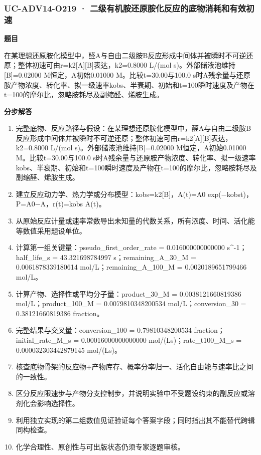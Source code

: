\documentclass[UTF8,11pt,a4paper]{ctexart}
\begin{document}
\subsubsection*{UC-ADV14-O219 · 二级有机胺还原胺化反应的底物消耗和有效初速}
\noindent\textbf{题目}\par
在某理想还原胺化模型中，醛A与自由二级胺B反应形成中间体并被瞬时不可逆还原；整体初速可由r=k2[A][B]表达，k2=0.8000 L/(mol s)。外部储液池维持[B]=0.02000 M恒定，A初始0.01000 M。比较t=30.00与100.0 s时A残余量与还原胺产物浓度、转化率、拟一级速率kobs、半衰期、初始和t=100瞬时速度及产物在t=100的摩尔比，忽略胺耗尽及副缩醛、烯胺生成。\par
\medskip\noindent\textbf{分步解答}
\begin{enumerate}
\item 完整底物、反应路径与假设：在某理想还原胺化模型中，醛A与自由二级胺B反应形成中间体并被瞬时不可逆还原；整体初速可由r=k2[A][B]表达，k2=0.8000 L/(mol s)。外部储液池维持[B]=0.02000 M恒定，A初始0.01000 M。比较t=30.00与100.0 s时A残余量与还原胺产物浓度、转化率、拟一级速率kobs、半衰期、初始和t=100瞬时速度及产物在t=100的摩尔比，忽略胺耗尽及副缩醛、烯胺生成。
\item 建立反应动力学、热力学或分布模型：kobs=k2[B]，A(t)=A0 exp(−kobst)，P=A0−A，r(t)=kobs A(t)。
\item 从原始反应计量或速率常数导出未知量的代数关系，所有浓度、时间、活化能等数值采用题设单位。
\item 计算第一组关键量：pseudo\_first\_order\_rate = 0.016000000000000 s\textasciicircum{}-1；half\_life\_s = 43.321698784997 s；remaining\_A\_30\_M = 0.0061878339180614 mol/L；remaining\_A\_100\_M = 0.0020189651799466 mol/L。
\item 计算产物、选择性或平均分子量：product\_30\_M = 0.0038121660819386 mol/L；product\_100\_M = 0.0079810348200534 mol/L；conversion\_30 = 0.38121660819386 fraction。
\item 完整结果与交叉量：conversion\_100 = 0.79810348200534 fraction；initial\_rate\_M\_s = 0.00016000000000000 mol/(Ls)；rate\_t100\_M\_s = 0.000032303442879145 mol/(Ls)。
\item 核查底物骨架的反应物+产物库存、概率分率归一、活化自由能与速率比之间的一致性。
\item 区分反应限速步与产物分支控制步，并说明实验中不受题设约束的副反应或溶剂化会影响选择性。
\item 利用独立实现的第二组数值见证验证每个答案字段；同时指出其不能替代跨辑同构检查。
\item 化学合理性、原创性与可出版状态仍须专家逐题审核。
\end{enumerate}
\end{document}
